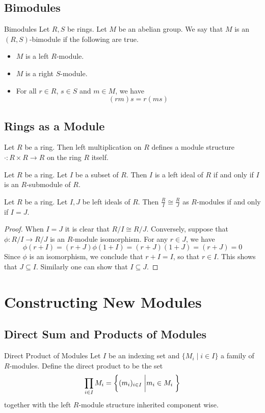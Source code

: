 \documentclass[a4paper]{article}
\begin{document}
\subsection{Bimodules}
\begin{defn}{Bimodules}{} Let $R,S$ be rings. Let $M$ be an abelian group. We say that $M$ is an $(R,S)$-bimodule if the following are true. 
\begin{itemize}
\item $M$ is a left $R$-module. 
\item $M$ is a right $S$-module. 
\item For all $r\in R$, $s\in S$ and $m\in M$, we have $$(rm)s=r(ms)$$
\end{itemize}
\end{defn}

\subsection{Rings as a Module}
Let $R$ be a ring. Then left multiplication on $R$ defines a module structure $\cdot:R\times R\to R$ on the ring $R$ itself. 

\begin{prp}{}{} Let $R$ be a ring. Let $I$ be a subset of $R$. Then $I$ is a left ideal of $R$ if and only if $I$ is an $R$-submodule of $R$. 
\end{prp}

\begin{prp}{}{} Let $R$ be a ring. Let $I,J$ be left ideals of $R$. Then $\frac{R}{I}\cong\frac{R}{J}$ as $R$-modules if and only if $I=J$. 
\begin{proof}
When $I=J$ it is clear that $R/I\cong R/J$. Conversely, suppose that $\phi:R/I\to R/J$ is an $R$-module isomorphism. For any $r\in J$, we have $$\phi(r+I)=(r+J)\phi(1+I)=(r+J)(1+J)=(r+J)=0$$ Since $\phi$ is an isomorphism, we conclude that $r+I=I$, so that $r\in I$. This shows that $J\subseteq I$. Similarly one can show that $I\subseteq J$. 
\end{proof}
\end{prp}

\pagebreak
\section{Constructing New Modules}
\subsection{Direct Sum and Products of Modules}
\begin{defn}{Direct Product of Modules}{} Let $I$ be an indexing set and $\{M_i\;|\;i\in I\}$ a family of $R$-modules. Define the direct product to be the set $$\prod_{i\in I}M_i=\left\{(m_i)_{i\in I}\;\bigg{|}m_i\in M_i\;\right\}$$ together with the left $R$-module structure inherited component wise. 
\end{defn}
\end{document}
